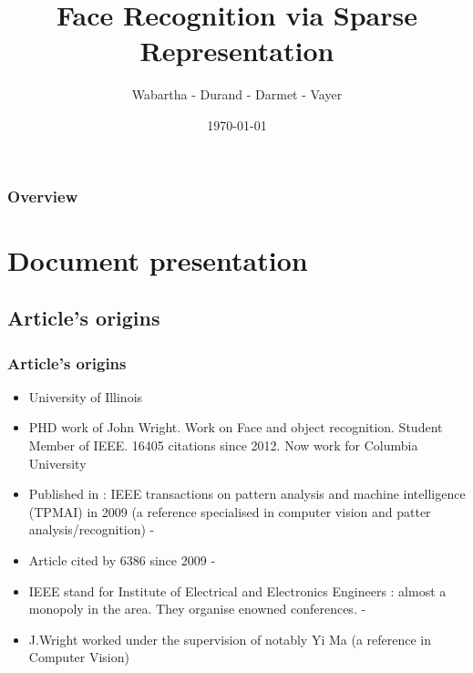 \documentclass{beamer}
\title[Face Recognition via Sparse Representation]{Face Recognition via Sparse Representation} %
\author{ Wabartha -  Durand -  Darmet -  Vayer} %
\date{\today} %
\begin{document}
\begin{frame}
\titlepage %
\end{frame}

\begin{frame}
\frametitle{Overview} %
  \tableofcontents
\end{frame}




  
\section{Document presentation}


	\subsection{Article's origins}
	
	\begin{frame}
		\frametitle{Article's origins}

\begin{itemize}		
\item University of Illinois
\item PHD work of John Wright. Work on Face and object recognition. Student Member of IEEE. 16405 citations since 2012. Now work for Columbia University
\item Published in : IEEE transactions on pattern analysis and machine intelligence (TPMAI) in 2009 (a reference specialised in computer vision and patter analysis/recognition)
-\item Article cited by 6386 since 2009
-\item IEEE stand for Institute of Electrical and Electronics Engineers : almost a monopoly in the area. They organise enowned conferences.  
-\item J.Wright worked under the supervision of notably Yi Ma (a reference in Computer Vision)
\end{itemize}


	
			\end{frame}
\end{document}
